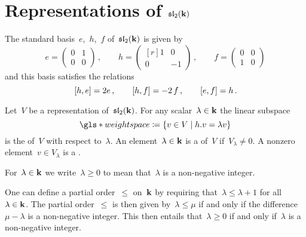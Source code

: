 \section{Representations of \texorpdfstring{$\mathfrak{sl}_2(\mathbf{k})$}{sl2(k)}}


\begin{recall}
  The standard basis~$e$,~$h$,~$f$ of~$\mathfrak{sl}_2(\mathbf{k})$ is given by
  \[
    e
    =
    \begin{pmatrix}
      0 & 1 \\
      0 & 0
    \end{pmatrix} \,,
    \qquad
    h
    =
    \begin{pmatrix*}[r]
      1 &  0 \\
      0 & -1
      \end{pmatrix*}  \,,
    \qquad
    f
    =
    \begin{pmatrix}
      0 & 0 \\
      1 & 0
    \end{pmatrix}
  \]
  and this basis satisfies the relations
  \[
    [h,e] = 2e \,,
    \qquad
    [h,f] = -2 \, f \,,
    \qquad
    [e,f] = h \,.
  \]
\end{recall}


\begin{definition}
  Let~$V$ be a representation of~$\mathfrak{sl}_2(\mathbf{k})$.
  For any scalar~$\lambda \in \mathbf{k}$ the linear subspace
  \[
    \gls*{weight space}
    \defined
    \{
      v \in V
    \suchthat
      h.v = \lambda v
    \}
  \]
  is the  of~$V$ with respect to~$\lambda$.
  An element~$\lambda \in \mathbf{k}$ is a  of~$V$ if~$V_\lambda \neq 0$.
  A nonzero element~$v \in V_\lambda$ is a .
\end{definition}


\begin{convention}
  For~$\lambda \in \mathbf{k}$ we write~$\lambda \geq 0$ to mean that~$\lambda$ is a non-negative integer.
\end{convention}


\begin{remark}
  One can define a partial order~$\leq$ on~$\mathbf{k}$ by requiring that~$\lambda \leq \lambda + 1$ for all~$\lambda \in \mathbf{k}$.
  The partial order~$\leq$ is then given by~$\lambda \leq \mu$ if and only if the difference~$\mu - \lambda$ is a non-negative integer.
  This then entails that~$\lambda \geq 0$ if and only if~$\lambda$ is a non-negative integer.
\end{remark}





